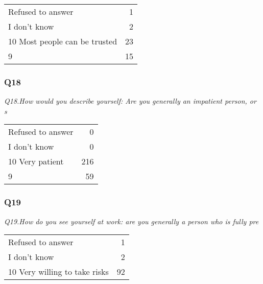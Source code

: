 \documentclass[
]{article}
\begin{document}
\begin{longtable}[]{@{}lr@{}}
\toprule
\endhead
Refused to answer & 1\tabularnewline
I don't know & 2\tabularnewline
10 Most people can be trusted & 23\tabularnewline
9 & 15\tabularnewline
\bottomrule
\end{longtable}

\hypertarget{q18-1}{%
\subsubsection{Q18}\label{q18-1}}

\textit{Q18.How would you describe yourself: Are you generally an impatient person, or s}

\begin{longtable}[]{@{}lr@{}}
\toprule
\endhead
Refused to answer & 0\tabularnewline
I don't know & 0\tabularnewline
10 Very patient & 216\tabularnewline
9 & 59\tabularnewline
\bottomrule
\end{longtable}

\hypertarget{q19-1}{%
\subsubsection{Q19}\label{q19-1}}

\textit{Q19.How do you see yourself at work: are you generally a person who is fully pre}

\begin{longtable}[]{@{}lr@{}}
\toprule
\endhead
Refused to answer & 1\tabularnewline
I don't know & 2\tabularnewline
10 Very willing to take risks & 92\tabularnewline
\bottomrule
\end{longtable}
\end{document}
